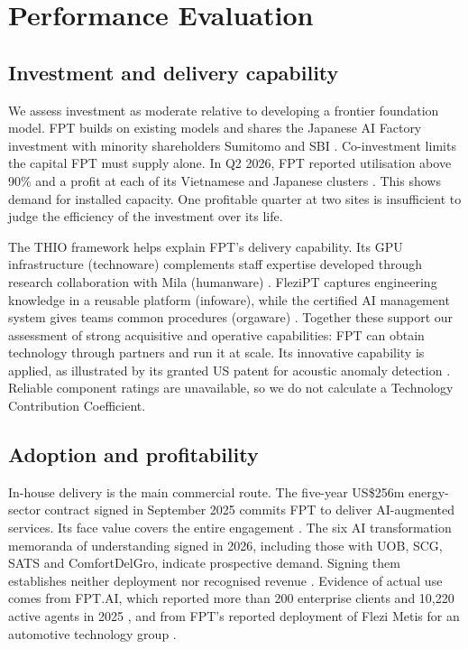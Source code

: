 \documentclass[a4paper,12pt]{report}
\begin{document}
\chapter{Performance Evaluation}

\section{Investment and delivery capability}

We assess investment as moderate relative to developing a frontier foundation model. FPT builds on existing models and shares the Japanese AI Factory investment with minority shareholders Sumitomo and SBI \cite{A5,A8}. Co-investment limits the capital FPT must supply alone. In Q2 2026, FPT reported utilisation above 90\% and a profit at each of its Vietnamese and Japanese clusters \cite{A29}. This shows demand for installed capacity. One profitable quarter at two sites is insufficient to judge the efficiency of the investment over its life.

The THIO framework helps explain FPT's delivery capability. Its GPU infrastructure (technoware) complements staff expertise developed through research collaboration with Mila (humanware) \cite{A16,A13}. FleziPT captures engineering knowledge in a reusable platform (infoware), while the certified AI management system gives teams common procedures (orgaware) \cite{A22,S23}. Together these support our assessment of strong acquisitive and operative capabilities: FPT can obtain technology through partners and run it at scale. Its innovative capability is applied, as illustrated by its granted US patent for acoustic anomaly detection \cite{S13}. Reliable component ratings are unavailable, so we do not calculate a Technology Contribution Coefficient.

\section{Adoption and profitability}

In-house delivery is the main commercial route. The five-year US\$256m energy-sector contract signed in September 2025 commits FPT to deliver AI-augmented services. Its face value covers the entire engagement \cite{S24}. The six AI transformation memoranda of understanding signed in 2026, including those with UOB, SCG, SATS and ComfortDelGro, indicate prospective demand. Signing them establishes neither deployment nor recognised revenue \cite{S25}. Evidence of actual use comes from FPT.AI, which reported more than 200 enterprise clients and 10,220 active agents in 2025 \cite{A26}, and from FPT's reported deployment of Flezi Metis for an automotive technology group .
\end{document}
